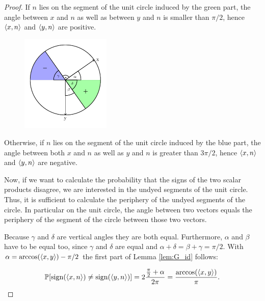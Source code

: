\begin{proof}
	\noindent\begin{minipage}{\textwidth}	
		If $n$ lies on the segment of the unit circle induced by the green part, the angle between $x$ and $n$ as well as between $y$ and $n$ is smaller than $\pi/2$, hence $\langle{x},{n}\rangle$ and $\langle{y},{n}\rangle$ are positive. 
		\begin{figure}
			\vspace{-20pt}
			\begin{center}
				\includegraphics[width=0.38\textwidth]{chapters/fig_unit_circle.pdf}
			\end{center}
			\vspace{-20pt}
		\end{figure}
		Otherwise, if $n$ lies on the segment of the unit circle induced by the blue part, the angle between both $x$ and $n$ as well as $y$ and $n$ is greater than $3\pi/2$, hence $\langle{x},{n}\rangle$ and $\langle{y},{n}\rangle$ are negative.
		
		\hspace{12pt} Now, if we want to calculate the probability that the signs of the two scalar products disagree, we are interested in the undyed segments of the unit circle. Thus, it is sufficient to calculate the periphery of the undyed segments of the circle. In particular on the unit circle, the angle between two vectors equals the periphery of the segment of the circle between those two vectors. 
			
		\hspace{12pt} Because $\gamma$ and $\delta$ are vertical angles they are both equal. Furthermore, $\alpha$ and $\beta$ have to be equal too, since $\gamma$ and $\delta$ are equal and $\alpha+\delta = \beta+\gamma = \pi/2$. With $\alpha = \arccos(\langle{x},{y}\rangle) - \pi/2$ the first part of Lemma \ref{lem:G_id} follows:
	\end{minipage}
	
	\begin{align*}
		\mathbb{P}[\operatorname{sign}(\langle{x},{n}\rangle)\neq\operatorname{sign}(\langle{y},{n}\rangle)]=2\frac{\frac{\pi}{2}+\alpha}{2\pi} = \frac{\arccos(\langle{x},{y}\rangle)}{\pi}.
	\end{align*}
	

\end{proof}

